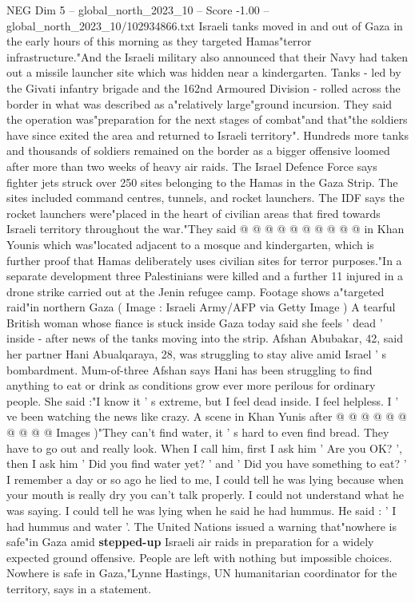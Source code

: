 \begin{textsample}{NEG Dim 5 – global\_north\_2023\_10 – Score -1.00 – global\_north\_2023\_10/102934866.txt}  \label{ex:f5_neg_021}
Israeli tanks moved in and out of Gaza in the early hours of this morning as they targeted Hamas"terror infrastructure."And the Israeli military also announced that their Navy had taken out a missile launcher site which was hidden near a kindergarten.
Tanks - led by the Givati infantry brigade and the 162nd Armoured Division - rolled across the border in what was described as a"relatively large"ground incursion.
They said the operation was"preparation for the next stages of combat"and that"the soldiers have since exited the area and returned to Israeli territory".
Hundreds more tanks and thousands of soldiers remained on the border as a bigger offensive loomed after more than two weeks of heavy air raids.
The Israel Defence Force says fighter jets struck over 250 sites belonging to the Hamas in the Gaza Strip.
The sites included command centres, tunnels, and rocket launchers.
The IDF says the rocket launchers were"placed in the heart of civilian areas that fired towards Israeli territory throughout the war."They said @ @ @ @ @ @ @ @ @ @ in Khan Younis which was"located adjacent to a mosque and kindergarten, which is further proof that Hamas deliberately uses civilian sites for terror purposes."In a separate development three Palestinians were killed and a further 11 injured in a drone strike carried out at the Jenin refugee camp.
Footage shows a"targeted raid"in northern Gaza ( Image : Israeli Army/AFP via Getty Image ) A tearful British woman whose fiance is stuck inside Gaza today said she feels ' dead ' inside - after news of the tanks moving into the strip.
Afshan Abubakar, 42, said her partner Hani Abualqaraya, 28, was struggling to stay alive amid Israel ' s bombardment.
Mum-of-three Afshan says Hani has been struggling to find anything to eat or drink as conditions grow ever more perilous for ordinary people.
She said :"I know it ' s extreme, but I feel dead inside.
I feel helpless.
I ' ve been watching the news like crazy.
A scene in Khan Yunis after @ @ @ @ @ @ @ @ @ @ Images )"They can't find water, it ' s hard to even find bread.
They have to go out and really look.
When I call him, first I ask him ' Are you OK? ', then I ask him ' Did you find water yet? ' and ' Did you have something to eat? ' I remember a day or so ago he lied to me, I could tell he was lying because when your mouth is really dry you can't talk properly.
I could not understand what he was saying.
I could tell he was lying when he said he had hummus.
He said : ' I had hummus and water '.
The United Nations issued a warning that"nowhere is safe"in Gaza amid \textbf{stepped-up} Israeli air raids in preparation for a widely expected ground offensive.
People are left with nothing but impossible choices.
Nowhere is safe in Gaza,"Lynne Hastings, UN humanitarian coordinator for the territory, says in a statement.

\end{textsample}
